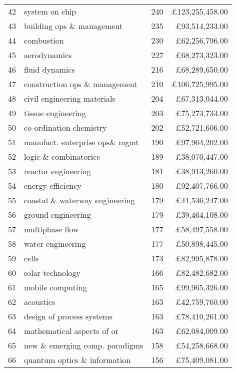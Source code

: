 \begin{spacing}{0.9}
\begin{longtable}[c]{r|>{\raggedleft\arraybackslash}m{6.5cm}|>{\raggedleft\arraybackslash}m{1.9cm}|r}
{42} & {system on chip} & {240} & {\pounds123,255,458.00}\\
{43} & {building ops \& management} & {235} & {\pounds93,514,233.00}\\
{44} & {combustion} & {230} & {\pounds62,256,796.00}\\
{45} & {aerodynamics} & {227} & {\pounds68,273,323.00}\\
{46} & {fluid dynamics} & {216} & {\pounds68,289,650.00}\\
{47} & {construction ops \& management} & {210} & {\pounds106,725,995.00}\\
{48} & {civil engineering materials} & {204} & {\pounds67,313,044.00}\\
{49} & {tissue engineering} & {203} & {\pounds75,273,733.00}\\
{50} & {co-ordination chemistry} & {202} & {\pounds52,721,606.00}\\
{51} & {manufact. enterprise ops\& mgmt} & {190} & {\pounds97,964,202.00}\\
{52} & {logic \& combinatorics} & {189} & {\pounds38,070,447.00}\\
{53} & {reactor engineering} & {181} & {\pounds38,913,260.00}\\
{54} & {energy efficiency} & {180} & {\pounds92,407,766.00}\\
{55} & {coastal \& waterway engineering} & {179} & {\pounds41,536,247.00}\\
{56} & {ground engineering} & {179} & {\pounds39,464,108.00}\\
{57} & {multiphase flow} & {177} & {\pounds58,497,558.00}\\
{58} & {water engineering} & {177} & {\pounds50,898,445.00}\\
{59} & {cells} & {173} & {\pounds82,995,878.00}\\
{60} & {solar technology} & {166} & {\pounds82,482,682.00}\\
{61} & {mobile computing} & {165} & {\pounds99,965,326.00}\\
{62} & {acoustics} & {163} & {\pounds42,759,760.00}\\
{63} & {design of process systems} & {163} & {\pounds78,410,261.00}\\
{64} & {mathematical aspects of or} & {163} & {\pounds62,084,009.00}\\
{65} & {new \& emerging comp. paradigms} & {158} & {\pounds54,258,668.00}\\
{66} & {quantum optics \& information} & {156} & {\pounds75,409,081.00}\\

\end{longtable}
\end{spacing}
